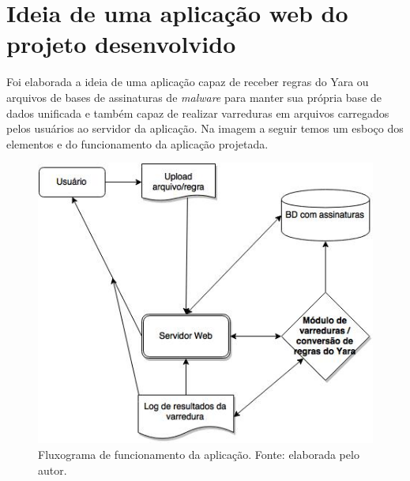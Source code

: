 \section{Ideia de uma aplicação web do projeto desenvolvido}
\label{s.prototipo}

Foi elaborada a ideia de uma aplicação capaz de receber regras do Yara ou
arquivos de bases de assinaturas de \textit{malware} para manter sua própria
base de dados unificada e também capaz de realizar varreduras em arquivos
carregados pelos usuários ao servidor da aplicação. Na imagem a seguir temos um
esboço dos elementos e do funcionamento da aplicação projetada.

\begin{figure}[H]
  \includegraphics[scale=0.6]{figs/flux_prototipo}
  \centering
  \caption{Fluxograma de funcionamento da aplicação. Fonte: elaborada pelo autor.}
  \label{f.flux_prototipo}
\end{figure}

